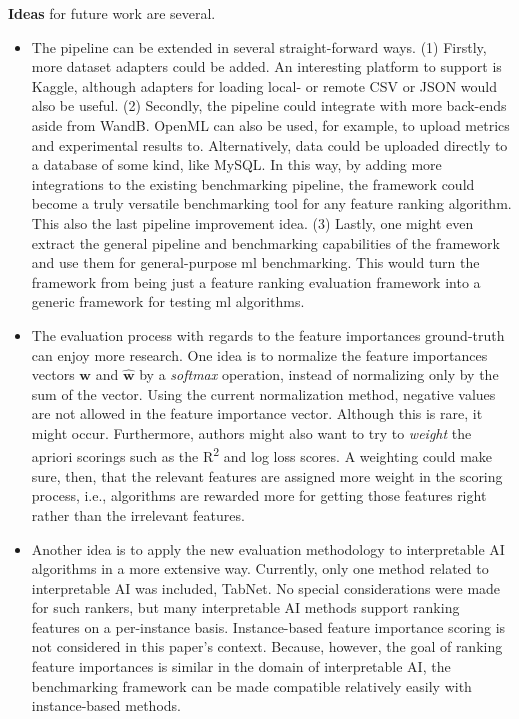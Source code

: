 \documentclass[../main.tex]{subfiles}
\begin{document}
\textbf{Ideas} for future work are several.
\begin{itemize}
    \item The pipeline can be extended in several straight-forward ways. (1) Firstly, more dataset adapters could be added. An interesting platform to support is Kaggle, although adapters for loading local- or remote CSV or JSON would also be useful. (2) Secondly, the pipeline could integrate with more back-ends aside from WandB. OpenML can also be used, for example, to upload metrics and experimental results to. Alternatively, data could be uploaded directly to a database of some kind, like MySQL. In this way, by adding more integrations to the existing benchmarking pipeline, the framework could become a truly versatile benchmarking tool for any feature ranking algorithm. This also the last pipeline improvement idea. (3) Lastly, one might even extract the general pipeline and benchmarking capabilities of the framework and use them for general-purpose \gls{ml} benchmarking. This would turn the framework from being just a feature ranking evaluation framework into a generic framework for testing \gls{ml} algorithms. 
    \item The evaluation process with regards to the feature importances ground-truth can enjoy more research. One idea is to normalize the feature importances vectors $\boldsymbol{w}$ and $\boldsymbol{\hat{w}}$ by a \textit{softmax} operation, instead of normalizing only by the sum of the vector. Using the current normalization method, negative values are not allowed in the feature importance vector. Although this is rare, it might occur. Furthermore, authors might also want to try to \textit{weight} the apriori scorings such as the R\textsuperscript{2} and log loss scores. A weighting could make sure, then, that the relevant features are assigned more weight in the scoring process, i.e., algorithms are rewarded more for getting those features right rather than the irrelevant features.
    \item Another idea is to apply the new evaluation methodology to interpretable AI algorithms in a more extensive way. Currently, only one method related to interpretable AI was included, TabNet. No special considerations were made for such rankers, but many interpretable AI methods support ranking features on a per-instance basis. Instance-based feature importance scoring is not considered in this paper's context. Because, however, the goal of ranking feature importances is similar in the domain of interpretable AI, the benchmarking framework can be made compatible relatively easily with instance-based methods.
\end{itemize}

\biblio
\end{document}
